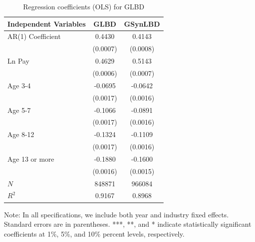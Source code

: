 \begin{table}[H]
  \centering
\caption{Regression coefficients (OLS) for GLBD} \label{tab:OLS_ger} \medskip
\renewcommand{\arraystretch}{1}
\setlength{\tabcolsep}{14pt}
\begin{tabular}{l|c |c}
\toprule
\textbf{Independent Variables}&\textbf{GLBD} &  \textbf{GSynLBD}\\
\midrule

AR(1) Coefficient&   0.4430\sym{***}&   0.4143\sym{***}\\
          & (0.0007)         & (0.0008)         \\
[1em]
Ln Pay    &   0.4629\sym{***}&   0.5143\sym{***}\\
          & (0.0006)         & (0.0007)         \\
[1em]
Age 3-4   &  -0.0695\sym{***}&  -0.0642\sym{***}\\
          & (0.0017)         & (0.0016)         \\
[1em]
Age 5-7   &  -0.1066\sym{***}&  -0.0891\sym{***}\\
          & (0.0017)         & (0.0016)         \\
[1em]
Age 8-12  &  -0.1324\sym{***}&  -0.1109\sym{***}\\
          & (0.0017)         & (0.0016)         \\
[1em]
Age 13 or more&  -0.1880\sym{***}&  -0.1600\sym{***}\\
          & (0.0016)         & (0.0015)         \\
\midrule
\(N\)     &   848871         &   966084         \\
\(R^{2}\) &   0.9167         &   0.8968         \\
    \bottomrule
  \end{tabular} 
\begin{tablenotes}
\small
\item Note: In all specifications, we include both year and industry fixed effects. Standard errors are in parentheses.  ***, **, and * indicate statistically significant coefficients at 1\%, 5\%, and 10\% percent levels, respectively.
 \end{tablenotes}
\end{table}




